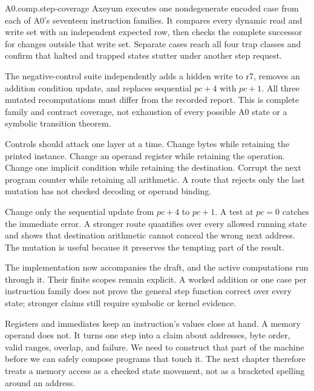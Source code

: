 \begin{artifact}{A0.comp.step-coverage}
Axeyum executes one nondegenerate encoded case from each of A0's seventeen
instruction families. It compares every dynamic read and write set with an
independent expected row, then checks the complete successor for changes
outside that write set. Separate cases reach all four trap classes and confirm
that halted and trapped states stutter under another step request.

The negative-control suite independently adds a hidden write to r7, removes an
addition condition update, and replaces sequential \(pc+4\) with \(pc+1\).
All three mutated recomputations must differ from the recorded report. This is
complete family and contract coverage, not exhaustion of every possible A0
state or a symbolic transition theorem.
\end{artifact}

Controls should attack one layer at a time. Change bytes while retaining the
printed instance. Change an operand register while retaining the operation.
Change one implicit condition while retaining the destination. Corrupt the
next program counter while retaining all arithmetic. A route that rejects
only the last mutation has not checked decoding or operand binding.

\begin{sidebar}[title={A useful first mutation}]
Change only the sequential update from \(pc+4\) to \(pc+1\). A test at
\(pc=0\) catches the immediate error. A stronger route quantifies over every
allowed running state and shows that destination arithmetic cannot conceal the
wrong next address. The mutation is useful because it preserves the tempting
part of the result.
\end{sidebar}

The implementation now accompanies the draft, and the active computations run
through it. Their finite scopes remain explicit. A worked addition or one case
per instruction family does not prove the general step function correct over
every state; stronger claims still require symbolic or kernel evidence.

Registers and immediates keep an instruction's values close at hand. A memory
operand does not. It turns one step into a claim about addresses, byte order,
valid ranges, overlap, and failure. We need to construct that part of the
machine before we can safely compose programs that touch it.
The next chapter therefore treats a memory access as a checked state movement,
not as a bracketed spelling around an address.

